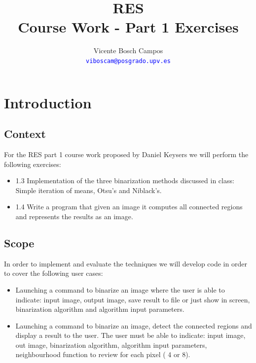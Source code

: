 \documentclass[a4paper,10pt,titlepage]{article}
\title{RES \\ Course Work - Part 1 Exercises}
\author{Vicente Bosch Campos \dag \\
\textcolor{blue}{\texttt{viboscam@posgrado.upv.es}}}
\begin{document}
\ifpdf
{}
\else
{}
\fi

\maketitle

\tableofcontents

\listoffigures

\newpage

\section{Introduction}
\subsection{Context}

\par For the RES part 1 course work proposed by Daniel Keysers we will perform the following exercises:
\begin{itemize}
	\item 1.3 Implementation of the three binarization methods discussed in class: Simple iteration of means, Otsu's and Niblack's.
	\item 1.4 Write a program that given an image it computes all connected regions and represents the results as an image.
\end{itemize}

\subsection{Scope}

\par In order to implement and evaluate the techniques we will develop code in order to cover the following user cases:
\begin{itemize}
	\item Launching a command to binarize an image where the user is able to indicate: input image, output image, save result to file or just show in screen, binarization algorithm and algorithm input parameters.
	\item Launching a command to binarize an image, detect the connected regions and display a result to the user. The user must be able to indicate: input image, out image, binarization algorithm, algorithm input parameters, neighbourhood function to review for each pixel ( 4 or 8).
\end{itemize}
\end{document}
